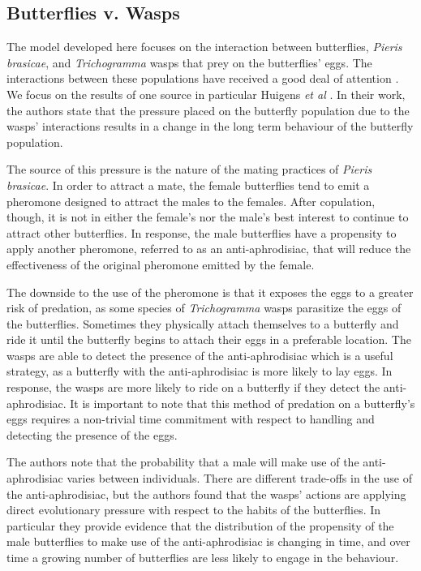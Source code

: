 \documentclass[review]{elsarticle}
\begin{document}
\subsection{Butterflies v. Wasps}
\label{butterflyVWasps}

The
model developed here focuses on the interaction between butterflies,
\textit{Pieris brasicae}, and \textit{Trichogramma} wasps that prey on
the butterflies' eggs. The interactions between these populations have
received a good deal of attention
\cite{PMC2797620,doi:10.1111/j.1439-0418.1986.tb00834.x,Figueroa2010AttractionOT,10.3389/fpls.2019.01768}. We
focus on the results of one source in particular Huigens \textit{et
  al} \cite{10.1093/beheco/arq007}. In their work, the authors state
that the pressure placed on the butterfly population due to the wasps'
interactions results in a change in the long term behaviour of the
butterfly population.

The source of this pressure is the nature of the mating practices of
\textit{Pieris brasicae}. In order to attract a mate, the female
butterflies tend to emit a pheromone designed to attract the males to
the females. After copulation, though, it is not in either the
female's nor the male's best interest to continue to attract other
butterflies. In response, the male butterflies have a propensity to
apply another pheromone, referred to as an anti-aphrodisiac, that will
reduce the effectiveness of the original pheromone emitted by the
female.

The downside to the use of the pheromone is that it exposes the eggs
to a greater risk of predation, as some species of \textit{Trichogramma}
wasps parasitize the eggs of the butterflies. Sometimes they
physically attach themselves to a butterfly and ride it until the
butterfly begins to attach their eggs in a preferable location. The
wasps are able to detect the presence of the anti-aphrodisiac which is
a useful strategy, as a butterfly with the
anti-aphrodisiac is more likely to lay eggs. In response, the wasps
are more likely to ride on a butterfly if they detect the
anti-aphrodisiac. It is important to note that this method of predation on
a butterfly's eggs requires a non-trivial time commitment with respect
to handling and detecting the presence of the eggs.

The authors \cite{10.1093/beheco/arq007} note that the probability that
a male will make use of the anti-aphrodisiac varies between
individuals. There are different trade-offs in the use of the
anti-aphrodisiac, but the authors found that the wasps' actions are
applying direct evolutionary pressure with respect to the habits of
the butterflies. In particular they provide evidence that the
distribution of the propensity of the male butterflies to make use of
the anti-aphrodisiac is changing in time, and over time a growing
number of butterflies are less likely to engage in the behaviour.
\end{document}
